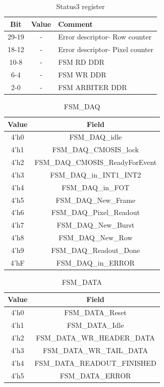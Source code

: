 \begin{table}[p]
\caption{\label{Status3} Status3 register}
\begin{center}
\begin{tabular}{|c|c|p{10cm}|}
\hline
Bit				& Value 		& Comment \\
\hline
29-19				& -			& Error descriptor- Row counter \\
\hline
18-12				& -	& Error descriptor- Pixel counter \\
\hline
10-8				& -			& FSM RD DDR\\
\hline
6-4				& -			& FSM WR DDR\\
\hline
2-0				& -			& FSM ARBITER DDR\\
\hline
\end{tabular}
\end{center}
\end{table}

\begin{table}
\caption{\label{FSM_DAQ} FSM\_DAQ}
\begin{center}
\begin{tabular}{|c|c|}
\hline
Value				& Field 	\\	
\hline
4'h0				& FSM\_DAQ\_idle \\
\hline
4'h1				& FSM\_DAQ\_CMOSIS\_lock \\
\hline
4'h2				& FSM\_DAQ\_CMOSIS\_ReadyForEvent \\
\hline
4'h3				& FSM\_DAQ\_in\_INT1\_INT2 \\
\hline
4'h4				& FSM\_DAQ\_in\_FOT \\
\hline
4'h5				& FSM\_DAQ\_New\_Frame \\
\hline
4'h6				& FSM\_DAQ\_Pixel\_Readout \\
\hline
4'h7				& FSM\_DAQ\_New\_Burst \\
\hline
4'h8				& FSM\_DAQ\_New\_Row \\
\hline
4'h9				& FSM\_DAQ\_Readout\_Done \\
\hline
4'hF				& FSM\_DAQ\_in\_ERROR \\

\hline
\end{tabular}
\end{center}
\end{table}


\begin{table}
\caption{\label{FSM_DATA} FSM\_DATA}
\begin{center}
\begin{tabular}{|c|c|}
\hline
Value				& Field 	\\	
\hline
4'h0				& FSM\_DATA\_Reset \\
\hline
4'h1				& FSM\_DATA\_Idle \\
\hline
4'h2				& FSM\_DATA\_WR\_HEADER\_DATA \\
\hline
4'h3				& FSM\_DATA\_WR\_TAIL\_DATA \\
\hline
4'h4				& FSM\_DATA\_READOUT\_FINISHED \\
\hline
4'h5				& FSM\_DATA\_ERROR \\


\hline
\end{tabular}
\end{center}
\end{table}


